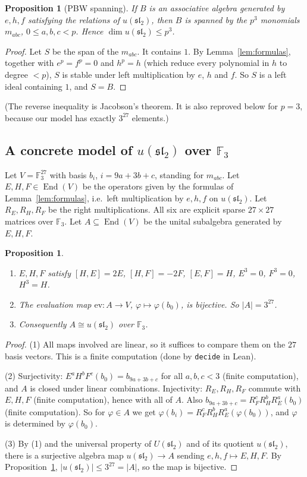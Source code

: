 \documentclass[11pt]{article}
\newtheorem{proposition}[theorem]{Proposition}
\theoremstyle{definition}
\theoremstyle{remark}
\newcommand{\F}{\mathbb{F}}
\newcommand{\slt}{\mathfrak{sl}_2}
\newcommand{\End}{\operatorname{End}}
\begin{document}
\begin{proposition}[PBW spanning]\label{prop:span}
If $B$ is an associative algebra generated by $e,h,f$ satisfying the relations of $u(\slt)$, then
$B$ is spanned by the $p^3$ monomials $m_{abc}$, $0\le a,b,c<p$. Hence $\dim u(\slt)\le p^3$.
\end{proposition}
\begin{proof}
Let $S$ be the span of the $m_{abc}$. It contains $1$. By Lemma~\ref{lem:formulas}, together with
$e^p=f^p=0$ and $h^p=h$ (which reduce every polynomial in $h$ to degree $<p$), $S$ is stable under
left multiplication by $e$, $h$ and $f$. So $S$ is a left ideal containing $1$, and $S=B$.
\end{proof}
(The reverse inequality is Jacobson's theorem. It is also reproved below for $p=3$, because our
model has exactly $3^{27}$ elements.)

\subsection{A concrete model of \texorpdfstring{$u(\mathfrak{sl}_2)$}{u(sl2)} over \texorpdfstring{$\F_3$}{F3}}
Let $V=\F_3^{27}$ with basis $b_i$, $i=9a+3b+c$, standing for $m_{abc}$. Let $E,H,F\in\End(V)$
be the operators given by the formulas of Lemma~\ref{lem:formulas}, i.e.\ left multiplication by
$e,h,f$ on $u(\slt)$. Let $R_E,R_H,R_F$ be the right multiplications. All six are explicit sparse
$27\times27$ matrices over $\F_3$. Let $A\subseteq\End(V)$ be the unital subalgebra generated by
$E,H,F$.

\begin{proposition}\label{prop:model}
\begin{enumerate}
\item $E,H,F$ satisfy $[H,E]=2E$, $[H,F]=-2F$, $[E,F]=H$, $E^3=0$, $F^3=0$, $H^3=H$.
\item The evaluation map $\mathrm{ev}\colon A\to V$, $\varphi\mapsto\varphi(b_0)$, is bijective.
So $|A|=3^{27}$.
\item Consequently $A\cong u(\slt)$ over $\F_3$.
\end{enumerate}
\end{proposition}
\begin{proof}
(1) All maps involved are linear, so it suffices to compare them on the $27$ basis vectors.
This is a finite computation (done by \texttt{decide} in Lean).

(2) Surjectivity: $E^aH^bF^c(b_0)=b_{9a+3b+c}$ for all $a,b,c<3$ (finite computation), and $A$ is
closed under linear combinations. Injectivity: $R_E,R_H,R_F$ commute with $E,H,F$ (finite
computation), hence with all of $A$. Also $b_{9a+3b+c}=R_F^cR_H^bR_E^a(b_0)$ (finite
computation). So for $\varphi\in A$ we get $\varphi(b_i)=R_F^cR_H^bR_E^a(\varphi(b_0))$, and
$\varphi$ is determined by $\varphi(b_0)$.

(3) By (1) and the universal property of $U(\slt)$ and of its quotient $u(\slt)$, there is a
surjective algebra map $u(\slt)\to A$ sending $e,h,f\mapsto E,H,F$. By
Proposition~\ref{prop:span}, $|u(\slt)|\le 3^{27}=|A|$, so the map is bijective.
\end{proof}
\end{document}
